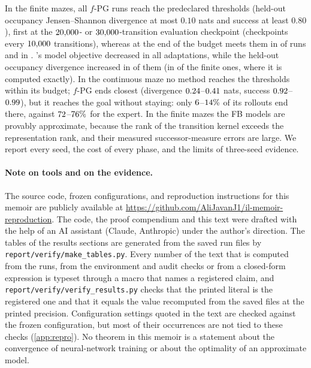\begin{titlepage}
\begin{minipage}{0.86\textwidth}
In the finite mazes, all  $f$-PG runs reach the predeclared thresholds (held-out occupancy Jensen--Shannon divergence at most $0.10$ nats and success at least $0.80$), first at the $\vn{abs.fpg.first.lo}{20{,}000}$- or $\vn{abs.fpg.first.hi}{30{,}000}$-transition evaluation checkpoint (checkpoints every $\vn{fpg.interval.f}{10{,}000}$ transitions), whereas at the end of the budget \ERFB{} meets them in  of  runs and \DMFB{} in .
\DMFB{}'s model objective decreased in all  adaptations, while the held-out occupancy divergence increased in  of them (in  of the  finite ones, where it is computed exactly).
In the continuous maze no method reaches the thresholds within its budget; $f$-PG ends closest (divergence $\vn{abs.cont.fpg.js.lo}{0.24}$--$\vn{abs.cont.fpg.js.hi}{0.41}$ nats, success $\vn{abs.cont.fpg.succ.lo}{0.92}$--$\vn{abs.cont.fpg.succ.hi}{0.99}$), but it reaches the goal without staying: only $\vn{s12.fpg.fig_pct.lo}{6}$--$\vn{s12.fpg.fig_pct.hi}{14}\%$ of its rollouts end there, against $\vn{s12.exp.fig_pct.lo}{72}$--$\vn{s12.exp.fig_pct.hi}{76}\%$ for the expert.
In the finite mazes the FB models are provably approximate, because the rank of the transition kernel exceeds the representation rank, and their measured successor-measure errors are large.
We report every seed, the cost of every phase, and the limits of three-seed evidence.
\end{minipage}
\vspace{1.2cm}
\end{titlepage}
\hypersetup{pageanchor=true}

\paragraph{Note on tools and on the evidence.}
The source code, frozen configurations, and reproduction instructions for this memoir are publicly available at \url{https://github.com/AliJavanJ1/il-memoir-reproduction}.
The code, the proof compendium and this text were drafted with the help of an AI assistant (Claude, Anthropic) under the author's direction.
The tables of the results sections are generated from the saved run files by \texttt{report/verify/make\_tables.py}.
Every number of the text that is computed from the runs, from the environment and audit checks or from a closed-form expression is typeset through a macro that names a registered claim, and \texttt{report/verify/verify\_results.py} checks that the printed literal is the registered one and that it equals the value recomputed from the saved files at the printed precision.
Configuration settings quoted in the text are checked against the frozen configuration, but most of their occurrences are not tied to these checks (\cref{app:repro}).
No theorem in this memoir is a statement about the convergence of neural-network training or about the optimality of an approximate model.

\setcounter{tocdepth}{2}
\tableofcontents
\clearpage
